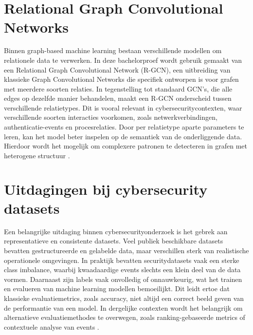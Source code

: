 \section{Relational Graph Convolutional Networks}

Binnen graph-based machine learning bestaan verschillende modellen om relationele data te verwerken. In deze bachelorproef wordt gebruik gemaakt van een Relational Graph Convolutional Network (R-GCN), een uitbreiding van klassieke Graph Convolutional Networks die specifiek ontworpen is voor grafen met meerdere soorten relaties.
\newline
\newline
In tegenstelling tot standaard GCN’s, die alle edges op dezelfde manier behandelen, maakt een R-GCN onderscheid tussen verschillende relatietypes. Dit is vooral relevant in cybersecuritycontexten, waar verschillende soorten interacties voorkomen, zoals netwerkverbindingen, authenticatie-events en procesrelaties.
\newline
\newline
Door per relatietype aparte parameters te leren, kan het model beter inspelen op de semantiek van de onderliggende data. Hierdoor wordt het mogelijk om complexere patronen te detecteren in grafen met heterogene structuur \autocite{Schlichtkrull2017}.

\section{Uitdagingen bij cybersecurity datasets}

Een belangrijke uitdaging binnen cybersecurityonderzoek is het gebrek aan representatieve en consistente datasets. Veel publiek beschikbare datasets bevatten gestructureerde en gelabelde data, maar verschillen sterk van realistische operationele omgevingen.
\newline
\newline
In praktijk bevatten securitydatasets vaak een sterke class imbalance, waarbij kwaadaardige events slechts een klein deel van de data vormen. Daarnaast zijn labels vaak onvolledig of onnauwkeurig, wat het trainen en evalueren van machine learning modellen bemoeilijkt.
\newline
\newline
Dit leidt ertoe dat klassieke evaluatiemetrics, zoals accuracy, niet altijd een correct beeld geven van de performantie van een model. In dergelijke contexten wordt het belangrijk om alternatieve evaluatiemethodes te overwegen, zoals ranking-gebaseerde metrics of contextuele analyse van events \autocite{Ring2019}.

